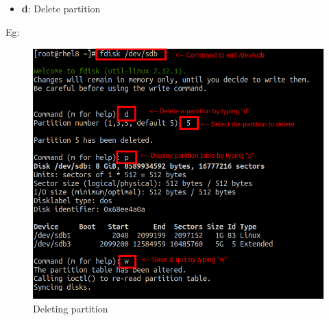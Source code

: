 \begin{flushleft}
\begin{itemize}
	\item \textbf{d}: Delete partition
\end{itemize}
Eg:
\begin{figure}[h!]
	\centering
	\includegraphics[scale=.4]{content/chapter8/images/delete.png}
	\caption{Deleting partition}
	\label{primary_logi3}
\end{figure}		



	
\end{flushleft}

\newpage

